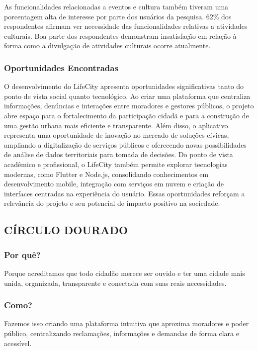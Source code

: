 As funcionalidades relacionadas a eventos e cultura também tiveram uma
porcentagem alta de interesse por parte dos usuários da pesquisa. 62\% dos
respondentes afirmam ver necessidade das funcionalidades relativas a atividades
culturais. Boa parte dos respondentes demonstram insatisfação em relação à forma
como a divulgação de atividades culturais ocorre atualmente.

\subsubsection{Oportunidades Encontradas}

O desenvolvimento do LifeCity apresenta oportunidades significativas tanto do ponto
de vista social quanto tecnológico. Ao criar uma plataforma que centraliza
informações, denúncias e interações entre moradores e gestores públicos, o projeto
abre espaço para o fortalecimento da participação cidadã e para a construção de
uma gestão urbana mais eficiente e transparente. Além disso, o aplicativo
representa uma oportunidade de inovação no mercado de soluções cívicas,
ampliando a digitalização de serviços públicos e oferecendo novas possibilidades de
análise de dados territoriais para tomada de decisões. Do ponto de vista acadêmico
e profissional, o LifeCity também permite explorar tecnologias modernas, como
Flutter e Node.js, consolidando conhecimentos em desenvolvimento mobile,
integração com serviços em nuvem e criação de interfaces centradas na experiência
do usuário. Essas oportunidades reforçam a relevância do projeto e seu potencial de
impacto positivo na sociedade.

\subsection{CÍRCULO DOURADO}

\subsubsection{Por quê?}

Porque acreditamos que todo cidadão merece ser ouvido e ter uma cidade mais
unida, organizada, transparente e conectada com suas reais necessidades.

\subsubsection{Como?}

Fazemos isso criando uma plataforma intuitiva que aproxima moradores e poder
público, centralizando reclamações, informações e demandas de forma clara e
acessível.

